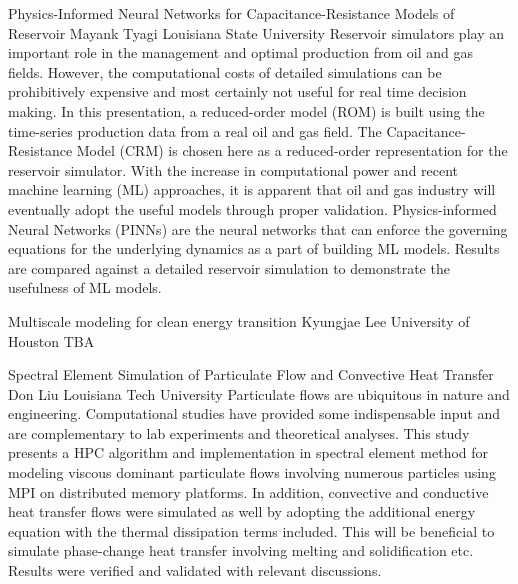 \begin{addmargin}[2em]{0em}
\vspace{1.5ex}
\abs
{Physics-Informed Neural Networks for Capacitance-Resistance Models of Reservoir}
{Mayank Tyagi}
{Louisiana State University}
{Reservoir simulators play an important role in the management and optimal production from oil and gas fields. However, the computational costs of detailed simulations can be prohibitively expensive and most certainly not useful for real time decision making. In this presentation, a reduced-order model (ROM) is built using the time-series production data from a real oil and gas field. The Capacitance-Resistance Model (CRM) is chosen here as a reduced-order representation for the reservoir simulator. With the increase in computational power and recent machine learning (ML) approaches, it is apparent that oil and gas industry will eventually adopt the useful models through proper validation. Physics-informed Neural Networks (PINNs) are the neural networks that can enforce the governing equations for the underlying dynamics as a part of building ML models. Results are compared against a detailed reservoir simulation to demonstrate the usefulness of ML models.}

\vspace{1.5ex}
\abs
{Multiscale modeling for clean energy transition}
{Kyungjae Lee}
{University of Houston}
{TBA}

\vspace{1.5ex}
\abs
{Spectral Element Simulation of Particulate Flow and Convective Heat Transfer}
{Don Liu}
{Louisiana Tech University}
{Particulate flows are ubiquitous in nature and engineering. Computational studies have provided some indispensable input and are complementary to lab experiments and theoretical analyses. This study presents a HPC algorithm and implementation in spectral element method for modeling viscous dominant particulate flows involving numerous particles using MPI on distributed memory platforms. In addition, convective and conductive heat transfer flows were simulated as well by adopting the additional energy equation with the thermal dissipation terms included. This will be beneficial to simulate phase-change heat transfer involving melting and solidification etc. Results were verified and validated with relevant discussions.}


\end{addmargin}
